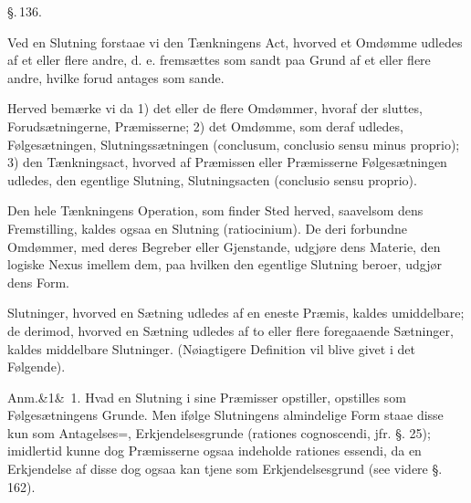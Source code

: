 \documentclass[12pt]{book}
\def\sperr#1{#1}%
\def\textit#1{#1}%
\def\emph#1{#1}%
\newcommand{\sperr}[1]{\textls[180]{#1}}
\newcommand{\parag}[1]{%
  \par\vspace{0.9\baselineskip}%
  {\centering\textit{\S.\,#1.}\par}%
  \vspace{0.35\baselineskip}%
  \noindent\hspace{\parindent}\ignorespaces
}
\newcommand{\anm}[1]{%
  \par\vspace{0.5\baselineskip}%
  \noindent\hspace{\parindent}\sperr{Anm.}\ifx&#1&\else~\textit{#1}.\fi
  \enspace\ignorespaces
}
\newcommand{\opage}[1]{\marginnote{\footnotesize\textit{[#1]}}}
\begin{document}
\parag{136}

Ved en Slutning forstaae vi den Tænkningens Act, hvorved et Omdømme udledes af et
eller flere andre, d. e. fremsættes som sandt paa Grund af et eller flere andre,
hvilke forud antages som sande.

Herved bemærke vi da 1) det eller de flere Omdømmer, hvoraf der sluttes,
Forudsætningerne, Præmisserne; 2) det Omdømme, som deraf udledes, Følgesætningen,
Slutningssætningen (\textit{conclusum, conclusio sensu minus proprio}); 3) den
Tænkningsact, hvorved af Præmissen eller Præmisserne Følgesætningen udledes, den
egentlige Slutning, Slutningsacten (\textit{conclusio sensu proprio}).

Den hele Tænkningens Operation, som finder Sted herved, saavelsom dens Fremstilling,
kaldes ogsaa en Slutning (\textit{ratiocinium}). De deri forbundne Omdømmer, med deres
Begreber eller Gjenstande, udgjøre dens \emph{Materie}, den logiske \emph{Nexus}
imellem dem, paa hvilken den egentlige Slutning beroer, udgjør dens \emph{Form}.

Slutninger, hvorved en Sætning udledes af en eneste Præmis, kaldes
\emph{umiddelbare}; de derimod, hvorved en Sætning udledes af to eller flere
foregaaende Sætninger, kaldes \emph{middelbare} Slutninger. (Nøiagtigere Definition
vil blive givet i det Følgende).
\opage{324} \anm{1} Hvad en Slutning i sine Præmisser opstiller, opstilles som Følgesætningens
Grunde. Men ifølge Slutningens almindelige Form staae disse kun som Antagelses=,
Erkjendelsesgrunde (\textit{rationes cognoscendi}, jfr. §. 25); imidlertid kunne dog
Præmisserne ogsaa indeholde \textit{rationes essendi}, da en Erkjendelse af disse dog
ogsaa kan tjene som Erkjendelsesgrund (see videre §. 162).
\end{document}
